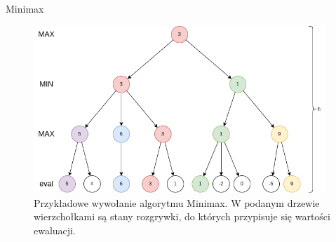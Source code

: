 \begin{frame}{Minimax}
	
	\begin{figure}
		\centering
		\includegraphics[width=11cm]{figures/minimax3.png}
		\caption{Przykładowe wywołanie algorytmu Minimax. W podanym drzewie wierzchołkami są stany rozgrywki, do których przypisuje się wartości ewaluacji.}
	\end{figure}

\end{frame}


